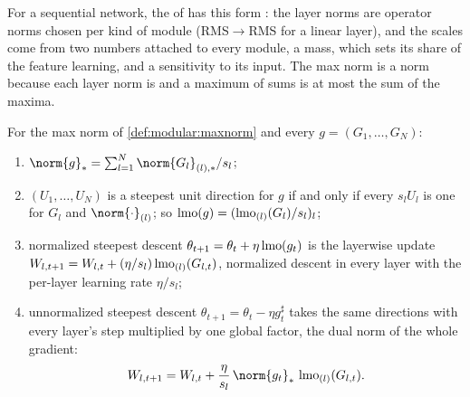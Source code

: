 \begin{refsection}

For a sequential network, the  of \textcite{LargeEtAl2024} has this form \parencite{BernsteinNewhouse2024}: the layer norms are operator norms chosen per kind of module (RMS$\to$RMS for a linear layer), and the scales come from two numbers attached to every module, a mass, which sets its share of the feature learning, and a sensitivity to its input. The max norm is a norm because each layer norm is and a maximum of sums is at most the sum of the maxima.

\begin{theorem}\label{thm:modular:dual}
For the max norm of \cref{def:modular:maxnorm} and every $g=(G_1,\dots,G_N)$:
\begin{enumerate}
\item $\norm{g}_*=\sum_{l=1}^N\norm{G_l}_{(l),*}/s_l$;
\item $(U_1,\dots,U_N)$ is a steepest unit direction for $g$ if and only if every $s_lU_l$ is one for $G_l$ and $\norm{\cdot}_{(l)}$; so $\operatorname{lmo}(g)=(\operatorname{lmo}_{(l)}(G_l)/s_l)_l$;
\item normalized steepest descent $\theta_{t+1}=\theta_t+\eta\operatorname{lmo}(g_t)$ is the layerwise update $W_{l,t+1}=W_{l,t}+(\eta/s_l)\operatorname{lmo}_{(l)}(G_{l,t})$, normalized descent in every layer with the per-layer learning rate $\eta/s_l$;
\item unnormalized steepest descent $\theta_{t+1}=\theta_t-\eta g_t^\sharp$ takes the same directions with every layer's step multiplied by one global factor, the dual norm of the whole gradient:
\[
  W_{l,t+1}=W_{l,t}+\frac{\eta}{s_l}\,\norm{g_t}_*\,\lmo_{(l)}(G_{l,t}).
\]
\end{enumerate}
\end{theorem}


\end{refsection}
